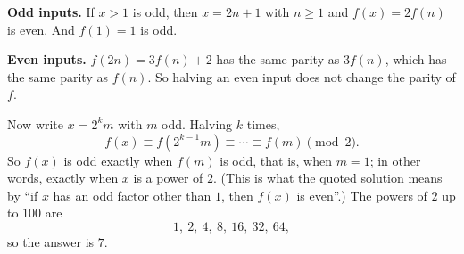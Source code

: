 \textbf{Odd inputs.} If $x>1$ is odd, then $x=2n+1$ with $n\ge1$ and $f(x)=2f(n)$ is even. And $f(1)=1$ is odd.

\textbf{Even inputs.} $f(2n)=3f(n)+2$ has the same parity as $3f(n)$, which has the same parity as $f(n)$. So halving an even input does not change the parity of $f$.

Now write $x=2^k m$ with $m$ odd. Halving $k$ times,
\[f(x)\equiv f(2^{k-1}m)\equiv\cdots\equiv f(m)\pmod2 .\]
So $f(x)$ is odd exactly when $f(m)$ is odd, that is, when $m=1$; in other words, exactly when $x$ is a power of $2$. (This is what the quoted solution means by ``if $x$ has an odd factor other than $1$, then $f(x)$ is even''.) The powers of $2$ up to $100$ are
\[1,\ 2,\ 4,\ 8,\ 16,\ 32,\ 64,\]
so the answer is $\boxed{7}$.
